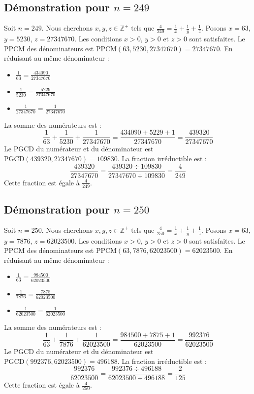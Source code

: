 \documentclass[11pt,a4paper]{article}
\begin{document}
\subsection{Démonstration pour $n = 249$}
Soit $n = 249$. Nous cherchons $x, y, z \in \mathbb{Z}^{+}$ tels que $\frac{4}{249} = \frac{1}{x} + \frac{1}{y} + \frac{1}{z}$.
Posons $x = 63$, $y = 5230$, $z = 27347670$.
Les conditions $x > 0$, $y > 0$ et $z > 0$ sont satisfaites.
Le PPCM des dénominateurs est $\text{PPCM}(63, 5230, 27347670) = 27347670$.
En réduisant au même dénominateur :
\begin{itemize}
    \item $\frac{1}{63} = \frac{434090}{27347670}$
    \item $\frac{1}{5230} = \frac{5229}{27347670}$
    \item $\frac{1}{27347670} = \frac{1}{27347670}$
\end{itemize}
La somme des numérateurs est :
$$ \frac{1}{63} + \frac{1}{5230} + \frac{1}{27347670} = \frac{434090 + 5229 + 1}{27347670} = \frac{439320}{27347670} $$
Le PGCD du numérateur et du dénominateur est $\text{PGCD}(439320, 27347670) = 109830$.
La fraction irréductible est :
$$ \frac{439320}{27347670} = \frac{439320 \div 109830}{27347670 \div 109830} = \frac{4}{249} $$
Cette fraction est égale à $\frac{4}{249}$.

\subsection{Démonstration pour $n = 250$}
Soit $n = 250$. Nous cherchons $x, y, z \in \mathbb{Z}^{+}$ tels que $\frac{4}{250} = \frac{1}{x} + \frac{1}{y} + \frac{1}{z}$.
Posons $x = 63$, $y = 7876$, $z = 62023500$.
Les conditions $x > 0$, $y > 0$ et $z > 0$ sont satisfaites.
Le PPCM des dénominateurs est $\text{PPCM}(63, 7876, 62023500) = 62023500$.
En réduisant au même dénominateur :
\begin{itemize}
    \item $\frac{1}{63} = \frac{984500}{62023500}$
    \item $\frac{1}{7876} = \frac{7875}{62023500}$
    \item $\frac{1}{62023500} = \frac{1}{62023500}$
\end{itemize}
La somme des numérateurs est :
$$ \frac{1}{63} + \frac{1}{7876} + \frac{1}{62023500} = \frac{984500 + 7875 + 1}{62023500} = \frac{992376}{62023500} $$
Le PGCD du numérateur et du dénominateur est $\text{PGCD}(992376, 62023500) = 496188$.
La fraction irréductible est :
$$ \frac{992376}{62023500} = \frac{992376 \div 496188}{62023500 \div 496188} = \frac{2}{125} $$
Cette fraction est égale à $\frac{4}{250}$.
\end{document}

